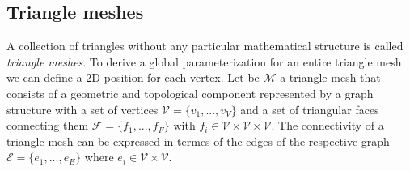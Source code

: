 
\subsection{Triangle meshes}
A collection of triangles without any particular mathematical structure is called \textit{triangle meshes}. To derive a global parameterization for an entire triangle mesh we can define a 2D position for each vertex. Let be $\mathcal{M}$ a triangle mesh that consists of a geometric and topological component represented by a graph structure with a set of vertices $\mathcal{V} = \{ v_1, ..., v_V \}$ and a set of triangular faces connecting them $\mathcal{F} = \{ f_1, ... , f_F \}$ with $f_i \in \mathcal{V} \times \mathcal{V} \times \mathcal{V}$. The connectivity of a triangle mesh can be expressed in termes of the edges of the respective graph $\mathcal{E} = \{ e_1, ..., e_E \}$ where $e_i \in \mathcal{V} \times \mathcal{V}$.
\cite{polygonmeshprocessing}
